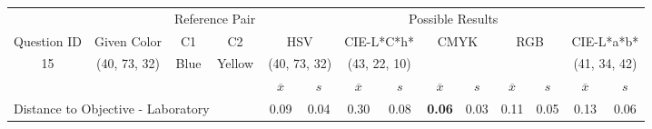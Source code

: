 %
\begin{table}[H]
  \resizebox{\textwidth}{!} {
  \begin{tabular}{lccccccccccccc}
    \hline
    \multicolumn{1}{c}{}                              &                                      & \multicolumn{2}{c}{Reference Pair}                   & \multicolumn{10}{c}{Possible Results}                                                                                                                                                                                                                                                                                        \\ \cline{3-14}
    \multicolumn{1}{c}{\multirow{-2}{*}{Question ID}} & \multirow{-2}{*}{Given Color}        & C1                       & C2                         & \multicolumn{2}{c}{HSV}                                        & \multicolumn{2}{c}{CIE-L*C*h*}                                 & \multicolumn{2}{c}{CMYK}                                       & \multicolumn{2}{c}{RGB}                                        & \multicolumn{2}{c}{CIE-L*a*b*}                                 \\ \hline
    \multicolumn{1}{c}{15}                             & \cellcolor[HTML]{00FF80}(40, 73, 32) & \multicolumn{1}{c|}{Blue} & \multicolumn{1}{c|}{Yellow}  & \multicolumn{2}{c|}{\cellcolor[HTML]{00FF80}(40, 73, 32)}      & \multicolumn{2}{c|}{\cellcolor[HTML]{FF0050}(43, 22, 10)}       & \multicolumn{2}{c|}{\cellcolor[HTML]{808080}{\color[HTML]{FFFFFF}(21, 22, 24)}}       & \multicolumn{2}{c|}{\cellcolor[HTML]{808080}{\color[HTML]{FFFFFF}(21, 22, 24)}}       & \multicolumn{2}{c|}{\cellcolor[HTML]{CA8AAA}(41, 34, 42)}       \\ \hline
                                                      & \multicolumn{1}{l}{}                 & \multicolumn{1}{l}{}     & \multicolumn{1}{l}{}       & \multicolumn{1}{c}{$\overline{x}$} & \multicolumn{1}{c}{$s$} & \multicolumn{1}{c}{$\overline{x}$} & \multicolumn{1}{c}{$s$} & \multicolumn{1}{c}{$\overline{x}$} & \multicolumn{1}{c}{$s$} & \multicolumn{1}{c}{$\overline{x}$} & \multicolumn{1}{c}{$s$} & \multicolumn{1}{c}{$\overline{x}$} & \multicolumn{1}{c}{$s$} \\ \hline
    \multicolumn{4}{l}{Distance to Objective - Laboratory}                                                                                           & \multicolumn{1}{|c}{0.09}       & \multicolumn{1}{c|}{0.04}    & \multicolumn{1}{|c}{0.30}       & \multicolumn{1}{c|}{0.08}    & \multicolumn{1}{|c}{\textbf{0.06}}       & \multicolumn{1}{c|}{0.03}    & \multicolumn{1}{|c}{0.11}       & \multicolumn{1}{c|}{0.05}    & \multicolumn{1}{|c}{0.13}       & \multicolumn{1}{c|}{0.06}    \\

\end{tabular}}
\end{table}
